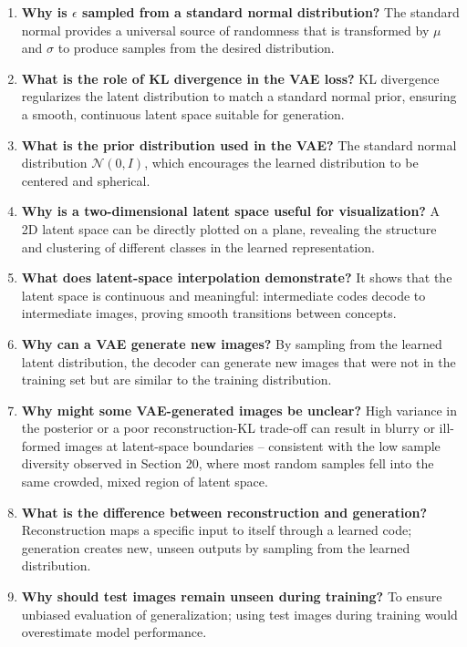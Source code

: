\documentclass[10pt]{article}
\begin{document}
\begin{enumerate}
\item \textbf{Why is $\epsilon$ sampled from a standard normal
distribution?} The standard normal provides a universal source of
randomness that is transformed by $\mu$ and $\sigma$ to produce samples
from the desired distribution.

\item \textbf{What is the role of KL divergence in the VAE loss?} KL
divergence regularizes the latent distribution to match a standard normal
prior, ensuring a smooth, continuous latent space suitable for generation.

\item \textbf{What is the prior distribution used in the VAE?} The
standard normal distribution $\mathcal{N}(0,I)$, which encourages the
learned distribution to be centered and spherical.

\item \textbf{Why is a two-dimensional latent space useful for
visualization?} A 2D latent space can be directly plotted on a plane,
revealing the structure and clustering of different classes in the learned
representation.

\item \textbf{What does latent-space interpolation demonstrate?} It shows
that the latent space is continuous and meaningful: intermediate codes
decode to intermediate images, proving smooth transitions between
concepts.

\item \textbf{Why can a VAE generate new images?} By sampling from the
learned latent distribution, the decoder can generate new images that were
not in the training set but are similar to the training distribution.

\item \textbf{Why might some VAE-generated images be unclear?} High
variance in the posterior or a poor reconstruction-KL trade-off can result
in blurry or ill-formed images at latent-space boundaries -- consistent
with the low sample diversity observed in Section 20, where most random
samples fell into the same crowded, mixed region of latent space.

\item \textbf{What is the difference between reconstruction and
generation?} Reconstruction maps a specific input to itself through a
learned code; generation creates new, unseen outputs by sampling from the
learned distribution.

\item \textbf{Why should test images remain unseen during training?} To
ensure unbiased evaluation of generalization; using test images during
training would overestimate model performance.

\end{enumerate}
\end{document}
